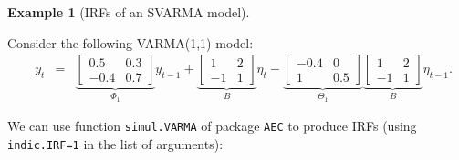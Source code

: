 \documentclass[
  12pt,
]{book}
\theoremstyle{definition}
\theoremstyle{definition}
\newtheorem{example}{Example}[chapter]
\theoremstyle{definition}
\theoremstyle{definition}
\theoremstyle{remark}
\begin{document}
\begin{example}[IRFs of an SVARMA model]
\protect\hypertarget{exm:IRFVARMA}{}\label{exm:IRFVARMA}

Consider the following VARMA(1,1) model:
\begin{eqnarray}
\quad y_t &=&
\underbrace{\left[\begin{array}{cc}
0.5 & 0.3 \\
-0.4 & 0.7
\end{array}\right]}_{\Phi_1}
y_{t-1} +  
\underbrace{\left[\begin{array}{cc}
1 & 2 \\
-1 & 1
\end{array}\right]}_{B}\eta_t - \underbrace{\left[\begin{array}{cc}
-0.4 & 0 \\
1 & 0.5
\end{array}\right]}_{\Theta_1} \underbrace{\left[\begin{array}{cc}
1 & 2 \\
-1 & 1
\end{array}\right]}_{B}\eta_{t-1}.\label{eq:VARMA111}
\end{eqnarray}

We can use function \texttt{simul.VARMA} of package \texttt{AEC} to produce IRFs (using \texttt{indic.IRF=1} in the list of arguments):


\end{example}
\end{document}
